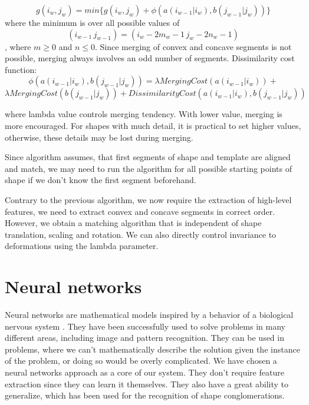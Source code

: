 \begin{equation*}
g(i_{w},j_{w}) = min\{g(i_{w},j_{w}) + \phi(a(i_{w-1}|i_{w}), b(j_{w-1}|j_{w}))\}
\end{equation*}
where the minimum is over all possible values of 
\begin{equation*}
(i_{w-1}\,j_{w-1})  =  (i_{w} - 2m_{w} -1\, j_{w} - 2n_{w} - 1)
\end{equation*}
, where $m \geq 0$ and $n \leq 0$.
Since merging of convex and concave segments is not possible, merging always involves an odd number of segments. Dissimilarity cost function: 
\begin{equation*}
\phi(a(i_{w-1}|i_{w}), b(j_{w-1}|j_{w}))  =  \lambda MergingCost(a(i_{w-1}|i_{w}))  +
\end{equation*}
\begin{equation*} 
\lambda MergingCost(b(j_{w-1}|j_{w}))  +  DissimilarityCost(a(i_{w-1}|i_{w}), b(j_{w-1}|j_{w}))
\end{equation*}

where lambda value controls merging tendency. With lower value, merging is more encouraged. For shapes with much detail, it is practical to set higher values, otherwise, these details may be lost during merging. 

Since algorithm assumes, that first segments of shape and template are aligned and match, we may need to run the algorithm for all possible starting points of shape if we don't know the first segment beforehand.

Contrary to the previous algorithm, we now require the extraction of high-level features, we need to extract convex and concave segments in correct order. However, we obtain a matching algorithm that is independent of shape translation, scaling and rotation. We can also directly control invariance to deformations using the lambda parameter.

\chapter{Neural networks}
Neural networks are mathematical models inspired by a behavior of a biological nervous system \cite{bishop}. They have been successfully used to solve problems in many different areas, including image and pattern recognition. They can be used in problems, where we can't mathematically describe the solution given the instance of the problem, or doing so would be overly complicated. We have chosen a neural networks approach as a core of our system. They don't require feature extraction since they can learn it themselves. They also have a great ability to generalize, which has been used for the recognition of shape conglomerations.

